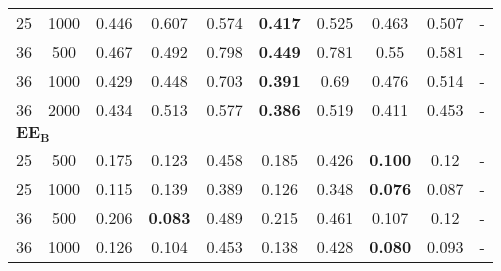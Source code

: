 \begin{landscape}
\begin{table}[!h]
\begin{tabular}{cccccccccc}
	 25  & 1000 &         0.446         &                 0.607                 &                      0.574                       & \textbf{0.417}                                 &                      0.525                       &          0.463           &           0.507            & -                 \\
	 36  & 500  &         0.467         &                 0.492                 &                      0.798                       & \textbf{0.449}                                 &                      0.781                       &           0.55           &           0.581            & -                 \\
	 36  & 1000 &         0.429         &                 0.448                 &                      0.703                       & \textbf{0.391}                                 &                       0.69                       &          0.476           &           0.514            & -                 \\
	 36  & 2000 &         0.434         &                 0.513                 &                      0.577                       & \textbf{0.386}                                 &                      0.519                       &          0.411           &           0.453            & -                 \\
	\hline
	\multicolumn{10}{l}{$\mathbf{EE_B}$} \\
	\hline
	 25  & 500  &         0.175         & 0.123                                 &                      0.458                       &                     0.185                      &                      0.426                       & \textbf{0.100}           &            0.12            & -                 \\
	 25  & 1000 &         0.115         & 0.139                                 &                      0.389                       &                     0.126                      &                      0.348                       & \textbf{0.076}           &           0.087            & -                 \\
	 36  & 500  &         0.206         & \textbf{0.083}                        &                      0.489                       &                     0.215                      &                      0.461                       & 0.107                    &            0.12            & -                 \\
	 36  & 1000 &         0.126         & 0.104                                 &                      0.453                       &                     0.138                      &                      0.428                       & \textbf{0.080}           &           0.093            & -                 \\

\end{tabular}
\end{table}
\end{landscape}
